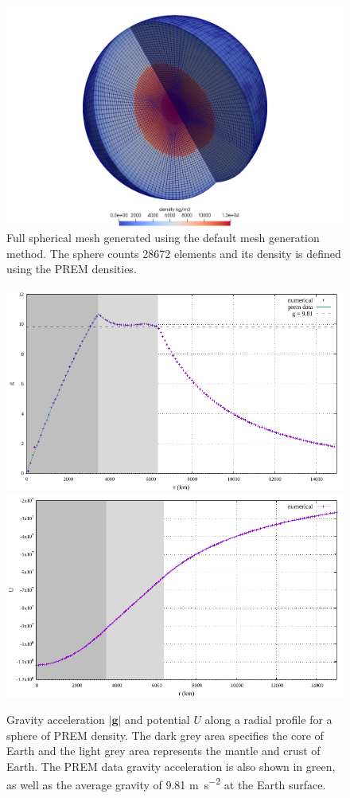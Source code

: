 \begin{figure}[h!]
\centering
\includegraphics[scale=0.30]{../../benchmarks/gravity_prem/doc/default_shell_full.png}
\caption{Full spherical mesh generated using the default mesh generation method. The sphere counts 28672 elements and its density is defined using the PREM densities.}
\label{fig:gravitywholesphere}
\end{figure}

\begin{figure}[h!]
\centering
\includegraphics[width=0.48\linewidth]{../../benchmarks/gravity_prem/doc/profile_gravity_prem_g.pdf}
\includegraphics[width=0.48\linewidth]{../../benchmarks/gravity_prem/doc/profile_gravity_prem_U.pdf}
\caption{Gravity acceleration $|{\mathbf g}|$ and potential $U$ along a radial profile for a sphere of PREM density. The dark grey area specifies the core of Earth and the light grey area represents the mantle and crust of Earth. The PREM data gravity acceleration is also shown in green, as well as the average gravity of 9.81 \si{\metre\per\square\second} at the Earth surface.}
\label{fig:gravityline2}
\end{figure}

